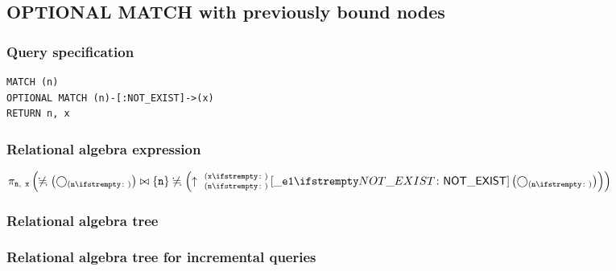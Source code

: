 \subsection{OPTIONAL MATCH with previously bound nodes}

\subsubsection*{Query specification}

\begin{lstlisting}
MATCH (n)
OPTIONAL MATCH (n)-[:NOT_EXIST]->(x)
RETURN n, x
\end{lstlisting}

\subsubsection*{Relational algebra expression}

$\projection{\var{n},~\var{x}} \left(\alldifferent{} \left(\getvertices{n}{}\right) \join \{\var{n}\} \alldifferent{} \left(\expandout{n}{x}{}{\_e1}{NOT\_EXIST} \left(\getvertices{n}{}\right)\right)\right)$

\subsubsection*{Relational algebra tree}


\subsubsection*{Relational algebra tree for incremental queries}


